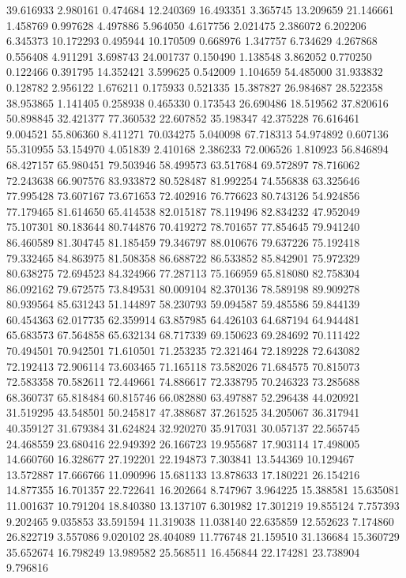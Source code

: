 39.616933
2.980161
0.474684
12.240369
16.493351
3.365745
13.209659
21.146661
1.458769
0.997628
4.497886
5.964050
4.617756
2.021475
2.386072
6.202206
6.345373
10.172293
0.495944
10.170509
0.668976
1.347757
6.734629
4.267868
0.556408
4.911291
3.698743
24.001737
0.150490
1.138548
3.862052
0.770250
0.122466
0.391795
14.352421
3.599625
0.542009
1.104659
54.485000
31.933832
0.128782
2.956122
1.676211
0.175933
0.521335
15.387827
26.984687
28.522358
38.953865
1.141405
0.258938
0.465330
0.173543
26.690486
18.519562
37.820616
50.898845
32.421377
77.360532
22.607852
35.198347
42.375228
76.616461
9.004521
55.806360
8.411271
70.034275
5.040098
67.718313
54.974892
0.607136
55.310955
53.154970
4.051839
2.410168
2.386233
72.006526
1.810923
56.846894
68.427157
65.980451
79.503946
58.499573
63.517684
69.572897
78.716062
72.243638
66.907576
83.933872
80.528487
81.992254
74.556838
63.325646
77.995428
73.607167
73.671653
72.402916
76.776623
80.743126
54.924856
77.179465
81.614650
65.414538
82.015187
78.119496
82.834232
47.952049
75.107301
80.183644
80.744876
70.419272
78.701657
77.854645
79.941240
86.460589
81.304745
81.185459
79.346797
88.010676
79.637226
75.192418
79.332465
84.863975
81.508358
86.688722
86.533852
85.842901
75.972329
80.638275
72.694523
84.324966
77.287113
75.166959
65.818080
82.758304
86.092162
79.672575
73.849531
80.009104
82.370136
78.589198
89.909278
80.939564
85.631243
51.144897
58.230793
59.094587
59.485586
59.844139
60.454363
62.017735
62.359914
63.857985
64.426103
64.687194
64.944481
65.683573
67.564858
65.632134
68.717339
69.150623
69.284692
70.111422
70.494501
70.942501
71.610501
71.253235
72.321464
72.189228
72.643082
72.192413
72.906114
73.603465
71.165118
73.582026
71.684575
70.815073
72.583358
70.582611
72.449661
74.886617
72.338795
70.246323
73.285688
68.360737
65.818484
60.815746
66.082880
63.497887
52.296438
44.020921
31.519295
43.548501
50.245817
47.388687
37.261525
34.205067
36.317941
40.359127
31.679384
31.624824
32.920270
35.917031
30.057137
22.565745
24.468559
23.680416
22.949392
26.166723
19.955687
17.903114
17.498005
14.660760
16.328677
27.192201
22.194873
7.303841
13.544369
10.129467
13.572887
17.666766
11.090996
15.681133
13.878633
17.180221
26.154216
14.877355
16.701357
22.722641
16.202664
8.747967
3.964225
15.388581
15.635081
11.001637
10.791204
18.840380
13.137107
6.301982
17.301219
19.855124
7.757393
9.202465
9.035853
33.591594
11.319038
11.038140
22.635859
12.552623
7.174860
26.822719
3.557086
9.020102
28.404089
11.776748
21.159510
31.136684
15.360729
35.652674
16.798249
13.989582
25.568511
16.456844
22.174281
23.738904
9.796816

